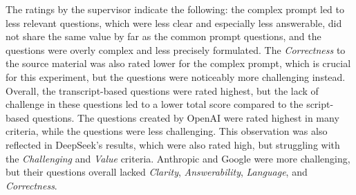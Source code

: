 The ratings by the supervisor indicate the following: the complex prompt led to less relevant questions, which were less clear and especially less answerable, did not share the same value by far as the common prompt questions, and the questions were overly complex and less precisely formulated. The \textit{Correctness} to the source material was also rated lower for the complex prompt, which is crucial for this experiment, but the questions were noticeably more challenging instead. Overall, the transcript-based questions were rated highest, but the lack of challenge in these questions led to a lower total score compared to the script-based questions. The questions created by OpenAI were rated highest in many criteria, while the questions were less challenging. This observation was also reflected in DeepSeek's results, which were also rated high, but struggling with the \textit{Challenging} and \textit{Value} criteria. Anthropic and Google were more challenging, but their questions overall lacked \textit{Clarity}, \textit{Answerability}, \textit{Language}, and \textit{Correctness}.

\begin{table}[htbp]
    \centering
    \caption[Supervisor-based qualitative Analysis Results by Prompt Type (Exp1a).]{Supervisor-based qualitative Analysis Results by Prompt Type (Exp1a).}
    \label{tab:exp1a-prompt-results}
\end{table}

